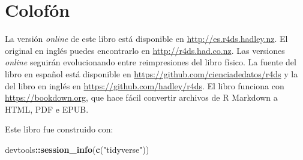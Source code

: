 \documentclass[11pt,oneside]{report}
\newenvironment{Shaded}{\begin{snugshade}}{\end{snugshade}}
\newcommand{\KeywordTok}[1]{\textcolor[rgb]{0.13,0.29,0.53}{\textbf{#1}}}
\newcommand{\NormalTok}[1]{#1}
\newcommand{\OperatorTok}[1]{\textcolor[rgb]{0.81,0.36,0.00}{\textbf{#1}}}
\newcommand{\StringTok}[1]{\textcolor[rgb]{0.31,0.60,0.02}{#1}}
\begin{document}
\hypertarget{colofuxf3n}{%
\section{Colofón}\label{colofuxf3n}}

La versión \emph{online} de este libro está disponible en
\url{http://es.r4ds.hadley.nz}. El original en inglés puedes encontrarlo
en \url{http://r4ds.had.co.nz}. Las versiones \emph{online} seguirán
evolucionando entre reimpresiones del libro físico. La fuente del libro
en español está disponible en
\url{https://github.com/cienciadedatos/r4ds} y la del libro en inglés en
\url{https://github.com/hadley/r4ds}. El libro funciona con
\url{https://bookdown.org}, que hace fácil convertir archivos de R
Markdown a HTML, PDF e EPUB.

Este libro fue construido con:

\begin{Shaded}
\begin{Highlighting}[]
\NormalTok{devtools}\OperatorTok{::}\KeywordTok{session_info}\NormalTok{(}\KeywordTok{c}\NormalTok{(}\StringTok{"tidyverse"}\NormalTok{))}
\end{Highlighting}
\end{Shaded}
\end{document}
